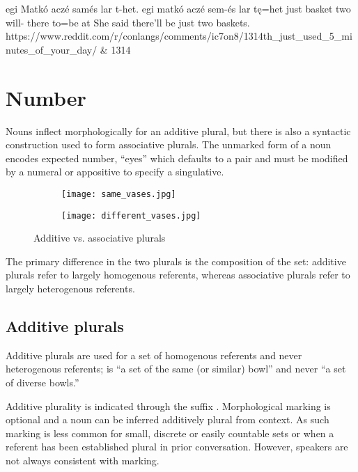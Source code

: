 \begin{examples*}
    \ex \label{ex:indirect_evidence}
        \script egi Matkó aczé samés lar t-het.
        \bits egi matkó aczé sem-és lar tę=het
        \gloss just basket\tbs{} two\tbs{} will- there to={be at}
        \tr She said there'll be just two baskets.
        \smoyd https://www.reddit.com/r/conlangs/comments/ic7on8/1314th_just_used_5_minutes_of_your_day/ & 1314
\end{examples*}

\section{Number}
Nouns inflect morphologically for an additive plural, but there is also a syntactic construction used to form associative plurals. The unmarked form of a noun encodes expected number, \eg {} “eyes” which defaults to a pair and must be modified by a numeral or appositive to specify a singulative. 

\begin{figure}[h]
    \centering
    \begin{subfigure}{0.4\textwidth}
        \centering
        \texttt{[image: same\_vases.jpg]}
        \caption{}
    \end{subfigure}
    \begin{subfigure}{0.4\textwidth}
        \centering
        \texttt{[image: different\_vases.jpg]}
        \caption{}
    \end{subfigure}
    \caption{Additive vs. associative plurals}
\end{figure}

The primary difference in the two plurals is the composition of the set: additive plurals refer to largely homogenous referents, whereas associative plurals refer to largely heterogenous referents.

\subsection{Additive plurals} \label{subsec:additive_plural}
Additive plurals are used for a set of homogenous referents and never heterogenous referents; \eg {} is “a set of the same (or similar) bowl” and never “a set of diverse bowls.”

Additive plurality is indicated through the suffix . Morphological marking is optional and a noun can be inferred additively plural from context.  As such marking is less common for small, discrete or easily countable sets or when a referent has been established plural in prior conversation. However, speakers are not always consistent with marking.

